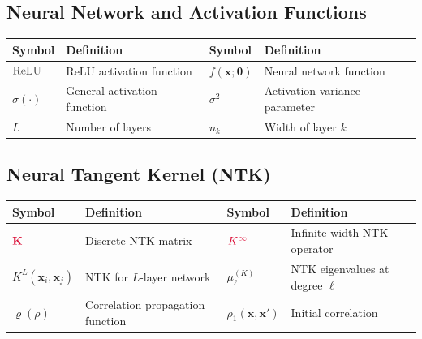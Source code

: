 \documentclass[a4paper]{article}
\newcommand{\ReLU}{\textcolor{relucolor}{\text{ReLU}}}
\DeclareRobustCommand{\ReLU}{\mathrel{\text{%
    \begin{tikzpicture}[baseline=(current bounding box.south)]
        \draw[thick] (0,0) -- (0.25,0) -- (0.4,0.25);
    \end{tikzpicture}}}\!\!}
\theoremstyle{plain}
\theoremstyle{definition}
\theoremstyle{remark}
\begin{document}
\begin{tcolorbox}[colback=blue!5,colframe=blue!50!black,title={\large \textbf{Mathematical Notation Reference}},enhanced,drop shadow]
\subsection*{Neural Network and Activation Functions}
\begin{longtable}{p{}p{}p{}p{}}
\toprule
\textbf{Symbol} & \textbf{Definition} & \textbf{Symbol} & \textbf{Definition} \\
\midrule
$\ReLU$ & ReLU activation function & $f(\mathbf{x}; \boldsymbol{\theta})$ & Neural network function \\
$\sigma(\cdot)$ & General activation function & $\sigma^2$ & Activation variance parameter \\
$L$ & Number of layers & $n_k$ & Width of layer $k$ \\
\bottomrule
\end{longtable}

\subsection*{Neural Tangent Kernel (NTK)}
\begin{longtable}{p{}p{}p{}p{}}
\toprule
\textbf{Symbol} & \textbf{Definition} & \textbf{Symbol} & \textbf{Definition} \\
\midrule
$\textcolor{kernelcolor}{\mathbf{K}}$ & Discrete NTK matrix & $\textcolor{kernelcolor}{K^{\infty}}$ & Infinite-width NTK operator \\
$K^{L}(\mathbf{x}_i, \mathbf{x}_j)$ & NTK for $L$-layer network & $\mu_\ell^{(K)}$ & NTK eigenvalues at degree $\ell$ \\
$\varrho(\rho)$ & Correlation propagation function & $\rho_1(\mathbf{x},\mathbf{x}')$ & Initial correlation \\
\bottomrule
\end{longtable}

\end{tcolorbox}
\end{document}
